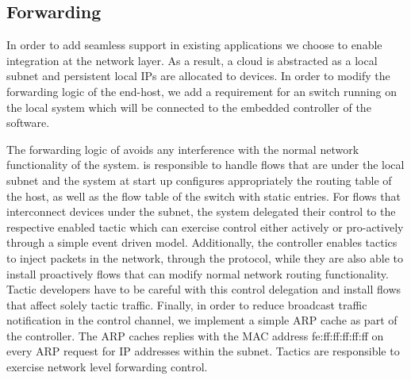 

\subsection{Forwarding} \label{signpost-forwarding}

In order to add seamless \signpost support in existing applications we choose to
enable \signpost integration at the network layer. As a result, a \signpost
cloud is abstracted as a local subnet and persistent local IPs are allocated to
devices. In order to modify the forwarding logic of the end-host, we add a
requirement for an \of switch running on the local system which will be
connected to the embedded \of controller of the \signpost software. 

The forwarding logic of \signpost avoids any interference with the normal
network functionality of the system. \signpost is responsible to handle flows
that are under the \signpost local subnet and the system at start up configures
appropriately the routing table of the host, as well as the \of flow table of
the switch with static entries. For flows that interconnect \signpost devices
under the \signpost subnet, the system delegated their control to the respective
enabled tactic which can exercise control either actively or pro-actively
through a simple event driven model. Additionally, the controller enables
tactics to inject packets in the network, through the \of protocol, while they
are also able to install proactively \of flows that can modify normal network
routing functionality.
Tactic developers have to be careful with this control delegation and install
flows that affect solely tactic traffic. Finally, in order to reduce broadcast
traffic notification in the control channel, we implement a simple ARP cache as part of the \of
controller. The ARP caches replies with the MAC address fe:ff:ff:ff:ff:ff on
every ARP request for IP addresses within the \signpost subnet. Tactics are
responsible to exercise network level forwarding control. 

